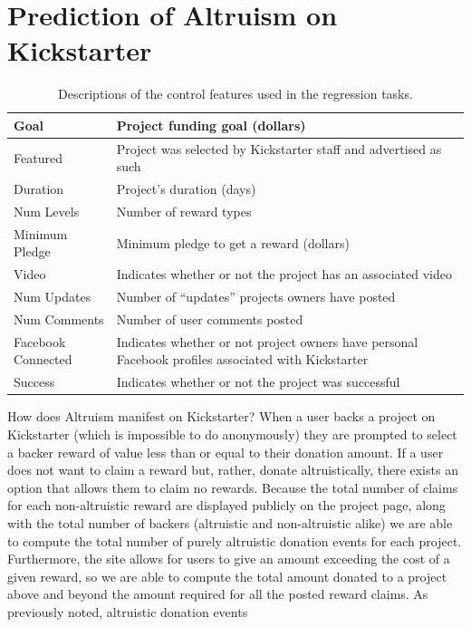 \documentclass[letterpaper]{article}
\begin{document}
\section{Prediction of Altruism on Kickstarter}
\begin{table}
\centering
\begin{tabular}{|l|L{5cm}|}
\hline
Goal & Project funding goal (dollars) \\\hline
Featured & Project was selected by Kickstarter staff and advertised as such\\\hline
Duration & Project's duration (days) \\\hline
Num Levels & Number of reward types \\\hline
Minimum Pledge & Minimum pledge to get a reward (dollars)\\\hline
Video & Indicates whether or not the project has an associated video \\\hline
Num Updates & Number of ``updates'' projects owners have posted \\\hline
Num Comments & Number of user comments posted \\\hline
Facebook Connected & Indicates whether or not project owners have personal Facebook profiles associated with Kickstarter\\\hline
Success & Indicates whether or not the project was successful\\
\hline
\end{tabular}
\caption{Descriptions of the control features used in the regression tasks.}
\label{tab:controls}
\end{table}
How does Altruism manifest on Kickstarter? When a user backs a project on Kickstarter (which is impossible to do anonymously) they are prompted to select a backer reward of value less than or equal to their donation amount. If a user does not want to claim a reward but, rather, donate altruistically, there exists an option that allows them to claim no rewards. Because the total number of claims for each non-altruistic reward are displayed publicly on the project page, along with the total number of backers (altruistic and non-altruistic alike) we are able to compute the total number of purely altruistic donation events for each project. Furthermore, the site allows for users to give an amount exceeding the cost of a given reward, so we are able to compute the total amount donated to a project above and beyond the amount required for all the posted reward claims. As previously noted, altruistic donation events 
\end{document}
